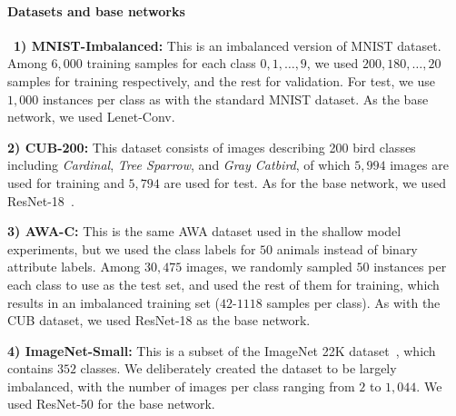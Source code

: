 \documentclass{article}
\begin{document}
	\paragraph{Datasets and base networks}
	
	\ \newline\newline \noindent \textbf{1) MNIST-Imbalanced:} This is an imbalanced version of MNIST dataset. Among $6,000$ training samples for each class $0, 1, \dots, 9$, we used $200, 180, \dots, 20$ samples for training respectively, and the rest for validation. For test, we use $1,000$ instances per class as with the standard MNIST dataset. As the base network, we used Lenet-Conv.
	
	\noindent \textbf{2) CUB-200:} This dataset consists of images describing 200 bird classes including \emph{Cardinal}, \emph{Tree Sparrow}, and \emph{Gray Catbird}, of which $5,994$ images are used for training and $5,794$ are used for test. As for the base network, we used ResNet-18~\cite{resnet}.
	
	\noindent \textbf{3) AWA-C:} This is the same AWA dataset used in the shallow model experiments, but we used the class labels for $50$ animals instead of binary attribute labels. Among $30,475$ images, we randomly sampled $50$ instances per each class to use as the test set, and used the rest of them for training, which results in an imbalanced training set ($42$-$1118$ samples per class). As with the CUB dataset, we used ResNet-18 as the base network. %
	
	\noindent \textbf{4) ImageNet-Small:} This is a subset of the ImageNet 22K dataset~\cite{imagenet}, which contains $352$ classes. We deliberately created the dataset to be largely imbalanced, with the number of images per class ranging from $2$ to $1,044$. We used ResNet-50 for the base network.
	
\end{document}
